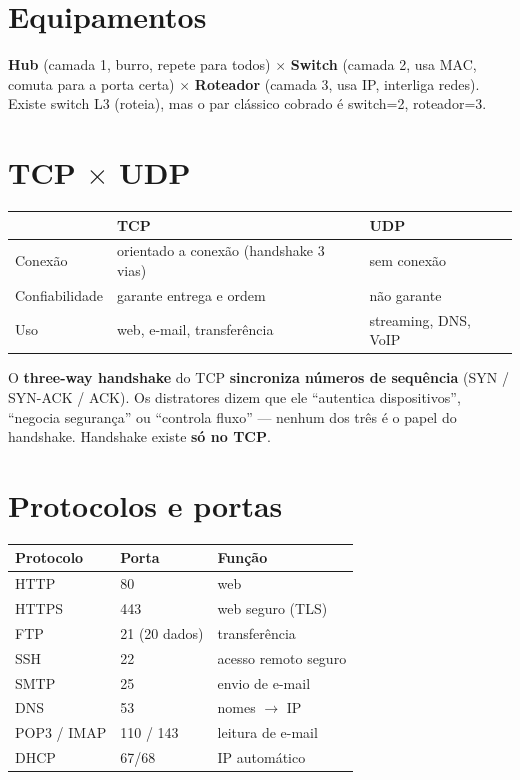 \section{Equipamentos}

\textbf{Hub} (camada 1, burro, repete para todos) $\times$ \textbf{Switch}
(camada 2, usa MAC, comuta para a porta certa) $\times$ \textbf{Roteador}
(camada 3, usa IP, interliga redes). Existe switch L3 (roteia), mas o par
clássico cobrado é switch=2, roteador=3.

\section{TCP $\times$ UDP}

\begin{center}
\begin{tabular}{@{}p{2.6cm}p{4.6cm}p{4.6cm}@{}}
\toprule
& \textbf{TCP} & \textbf{UDP} \\
\midrule
Conexão & orientado a conexão (handshake 3 vias) & sem conexão \\
Confiabilidade & garante entrega e ordem & não garante \\
Uso & web, e-mail, transferência & streaming, DNS, VoIP \\
\bottomrule
\end{tabular}
\end{center}

\begin{pegadinha}
O \textbf{three-way handshake} do TCP \textbf{sincroniza números de
sequência} (SYN / SYN-ACK / ACK). Os distratores dizem que ele ``autentica
dispositivos'', ``negocia segurança'' ou ``controla fluxo'' --- nenhum dos
três é o papel do handshake. Handshake existe \textbf{só no TCP}.
\end{pegadinha}

\section{Protocolos e portas}

\begin{center}
\begin{tabular}{@{}p{2.6cm}p{2.4cm}p{6.2cm}@{}}
\toprule
\textbf{Protocolo} & \textbf{Porta} & \textbf{Função} \\
\midrule
HTTP & 80 & web \\
HTTPS & 443 & web seguro (TLS) \\
FTP & 21 (20 dados) & transferência \\
SSH & 22 & acesso remoto seguro \\
SMTP & 25 & envio de e-mail \\
DNS & 53 & nomes $\to$ IP \\
POP3 / IMAP & 110 / 143 & leitura de e-mail \\
DHCP & 67/68 & IP automático \\
\bottomrule
\end{tabular}
\end{center}

